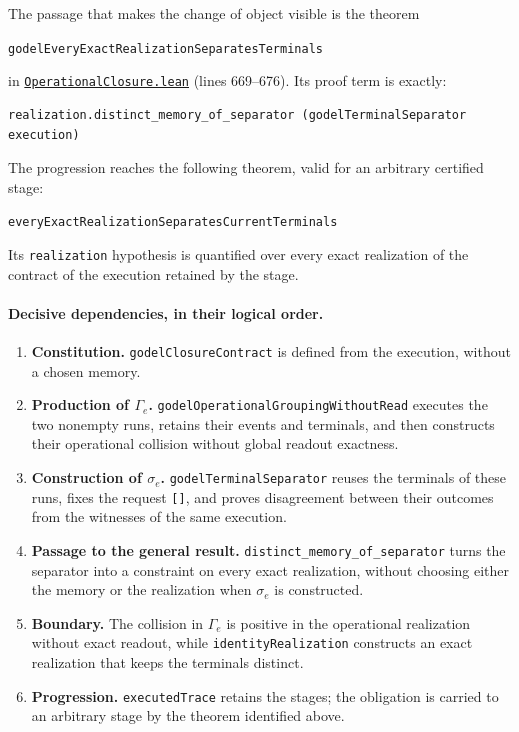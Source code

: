 \documentclass[11pt,a4paper]{article}
\newcommand{\code}[1]{\nolinkurl{#1}}
\newcommand{\SourceAt}[3]{\href{https://github.com/JohnDoe-collab-stack/relational-perimeter/blob/1e5aeda745559d62a3819bb3213da7fce3c31ad1/#1\#L#2}{\nolinkurl{#3}}}
\theoremstyle{remark}
\begin{document}
The passage that makes the change of object visible is the theorem
\begin{center}
\code{godelEveryExactRealizationSeparatesTerminals}
\end{center}
in
\SourceAt{RelationalPerimeter/Constitution/Godel/OperationalClosure.lean}{669-L676}{OperationalClosure.lean}
(lines 669--676). Its proof term is exactly:
\begin{Verbatim}[fontsize=\small]
realization.distinct_memory_of_separator (godelTerminalSeparator execution)
\end{Verbatim}
The progression reaches the following theorem, valid for an arbitrary
certified stage:
\begin{center}
\code{everyExactRealizationSeparatesCurrentTerminals}
\end{center}
Its \code{realization} hypothesis is quantified over every exact realization
of the contract of the execution retained by the stage.

\paragraph{Decisive dependencies, in their logical order.}
\begin{enumerate}[leftmargin=*,itemsep=3pt]
\item \textbf{Constitution.} \code{godelClosureContract} is defined from the execution, without a chosen memory.
\item \textbf{Production of $\Gamma_e$.} \code{godelOperationalGroupingWithoutRead} executes the two nonempty runs, retains their events and terminals, and then constructs their operational collision without global readout exactness.
\item \textbf{Construction of $\sigma_e$.} \code{godelTerminalSeparator} reuses the terminals of these runs, fixes the request \code{[]}, and proves disagreement between their outcomes from the witnesses of the same execution.
\item \textbf{Passage to the general result.} \code{distinct_memory_of_separator} turns the separator into a constraint on every exact realization, without choosing either the memory or the realization when $\sigma_e$ is constructed.
\item \textbf{Boundary.} The collision in $\Gamma_e$ is positive in the operational realization without exact readout, while \code{identityRealization} constructs an exact realization that keeps the terminals distinct.
\item \textbf{Progression.} \code{executedTrace} retains the stages; the obligation is carried to an arbitrary stage by the theorem identified above.
\end{enumerate}
\end{document}
